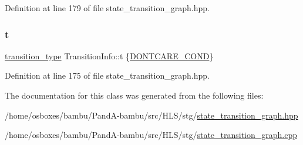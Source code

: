 Definition at line 179 of file state\+\_\+transition\+\_\+graph.\+hpp.

\mbox{\label{classTransitionInfo_a020b2feab25a20dedf5f735274940c82}} 
\subsubsection{\texorpdfstring{t}{t}}
{\footnotesize\ttfamily \hyperlink{state__transition__graph_8hpp_a73ce4c522d9c8d45a7e1ab48c95a1710}{transition\+\_\+type} Transition\+Info\+::t \{\hyperlink{state__transition__graph_8hpp_a73ce4c522d9c8d45a7e1ab48c95a1710a7a82876d2d9c7341c35e7d122536b54f}{D\+O\+N\+T\+C\+A\+R\+E\+\_\+\+C\+O\+ND}\}\hspace{0.3cm}{\ttfamily [private]}}



Definition at line 175 of file state\+\_\+transition\+\_\+graph.\+hpp.



The documentation for this class was generated from the following files\+:\begin{DoxyCompactItemize}
\item 
/home/osboxes/bambu/\+Pand\+A-\/bambu/src/\+H\+L\+S/stg/\hyperlink{state__transition__graph_8hpp}{state\+\_\+transition\+\_\+graph.\+hpp}\item 
/home/osboxes/bambu/\+Pand\+A-\/bambu/src/\+H\+L\+S/stg/\hyperlink{state__transition__graph_8cpp}{state\+\_\+transition\+\_\+graph.\+cpp}\end{DoxyCompactItemize}
